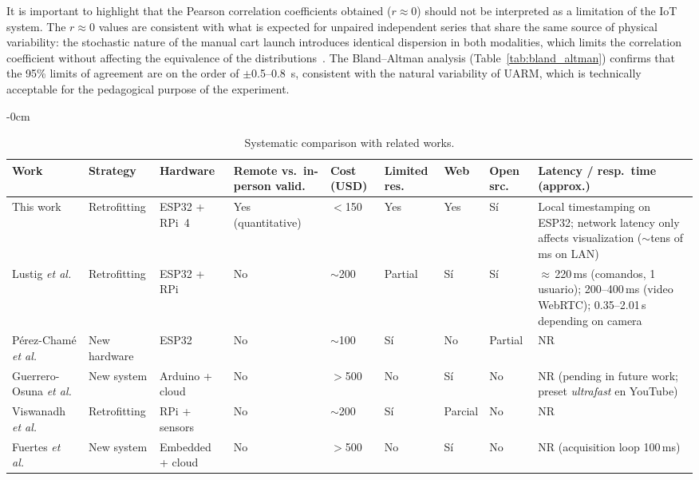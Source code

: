 \documentclass[sensors,article,submit,pdftex]{Definitions/mdpi}
\begin{document}
It is important to highlight that the Pearson correlation coefficients obtained ($r \approx 0$) should not be interpreted as a limitation of the IoT system. The $r \approx 0$ values are consistent with what is expected for unpaired independent series that share the same source of physical variability: the stochastic nature of the manual cart launch introduces identical dispersion in both modalities, which limits the correlation coefficient without affecting the equivalence of the distributions~\cite{giavarina2015}. The Bland--Altman analysis (Table~\ref{tab:bland_altman}) confirms that the 95\% limits of agreement are on the order of $\pm$0.5--0.8~s, consistent with the natural variability of UARM, which is technically acceptable for the pedagogical purpose of the experiment.

\begin{table}[H]
\caption{Systematic comparison with related works.}
\label{tab:comparacion}
\small
\begin{adjustwidth}{-\extralength}{0cm}
	\renewcommand{\arraystretch}{1.4}
	\begin{tabular}{p{2.5cm}p{1.6cm}p{1.8cm}p{2.2cm}p{1.0cm}p{1.0cm}p{0.8cm}p{0.8cm}p{3.5cm}}
		\toprule
		\textbf{Work} & \textbf{Strategy} & \textbf{Hardware} & \textbf{Remote vs.\ in-person valid.} & \textbf{Cost (USD)} & \textbf{Limited res.} & \textbf{Web} & \textbf{Open src.} & \textbf{Latency / resp.\ time (approx.)} \\
		\midrule
		This work                               & Retrofitting   & ESP32 + RPi~4   & Yes (quantitative) & $<$150      & Yes    & Yes    & S\'i    & Local timestamping on ESP32; network latency only affects visualization ($\sim$tens of ms on LAN) \\
		Lustig \textit{et al.}~\cite{r10}          & Retrofitting   & ESP32 + RPi     & No                  & $\sim$200   & Partial & S\'i    & S\'i    & $\approx$\,220\,ms (comandos, 1 usuario); 200--400\,ms (video WebRTC); 0.35--2.01\,s depending on camera \\
		P\'erez-Cham\'e \textit{et al.}~\cite{r11} & New hardware & ESP32           & No                  & $\sim$100   & S\'i    & No      & Partial & NR \\
		Guerrero-Osuna \textit{et al.}~\cite{r4}   & New system  & Arduino + cloud & No                  & $>$500      & No      & S\'i    & No      & NR (pending in future work; preset \textit{ultrafast} en YouTube) \\
		Viswanadh \textit{et al.}~\cite{r2}        & Retrofitting   & RPi + sensors  & No                  & $\sim$200   & S\'i    & Parcial & No      & NR \\
		Fuertes \textit{et al.}~\cite{r3}          & New system  & Embedded + cloud & No                  & $>$500      & No      & S\'i    & No      & NR (acquisition loop 100\,ms) \\
		\bottomrule
	\end{tabular}
\end{adjustwidth}
\end{table}
\end{document}
